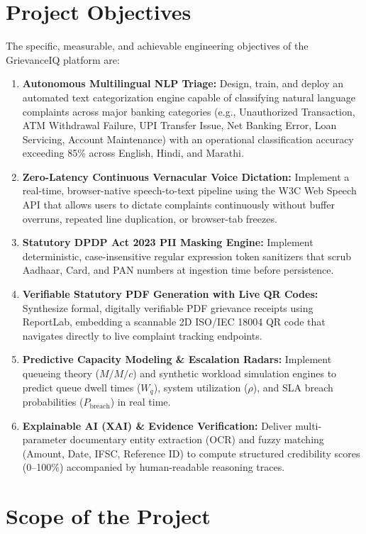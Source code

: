 \section{Project Objectives}
The specific, measurable, and achievable engineering objectives of the GrievanceIQ platform are:
\begin{enumerate}
    \item \textbf{Autonomous Multilingual NLP Triage:} Design, train, and deploy an automated text categorization engine capable of classifying natural language complaints across major banking categories (e.g., Unauthorized Transaction, ATM Withdrawal Failure, UPI Transfer Issue, Net Banking Error, Loan Servicing, Account Maintenance) with an operational classification accuracy exceeding 85\% across English, Hindi, and Marathi.
    \item \textbf{Zero-Latency Continuous Vernacular Voice Dictation:} Implement a real-time, browser-native speech-to-text pipeline using the W3C Web Speech API that allows users to dictate complaints continuously without buffer overruns, repeated line duplication, or browser-tab freezes.
    \item \textbf{Statutory DPDP Act 2023 PII Masking Engine:} Implement deterministic, case-insensitive regular expression token sanitizers that scrub Aadhaar, Card, and PAN numbers at ingestion time before persistence.
    \item \textbf{Verifiable Statutory PDF Generation with Live QR Codes:} Synthesize formal, digitally verifiable PDF grievance receipts using ReportLab, embedding a scannable 2D ISO/IEC 18004 QR code that navigates directly to live complaint tracking endpoints.
    \item \textbf{Predictive Capacity Modeling \& Escalation Radars:} Implement queueing theory ($M/M/c$) and synthetic workload simulation engines to predict queue dwell times ($W_q$), system utilization ($\rho$), and SLA breach probabilities ($P_{\text{breach}}$) in real time.
    \item \textbf{Explainable AI (XAI) \& Evidence Verification:} Deliver multi-parameter documentary entity extraction (OCR) and fuzzy matching (Amount, Date, IFSC, Reference ID) to compute structured credibility scores (0--100\%) accompanied by human-readable reasoning traces.
\end{enumerate}

\section{Scope of the Project}
